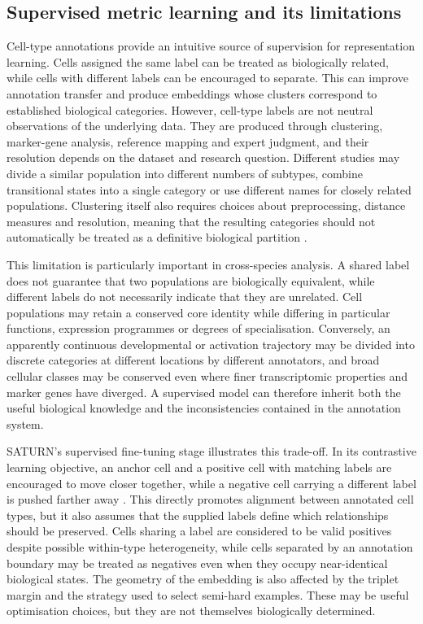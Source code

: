 \documentclass{article}
\begin{document}
\subsection{Supervised metric learning and its limitations}
Cell-type annotations provide an intuitive source of supervision for representation learning. Cells assigned the same label can be treated as biologically related, while cells with different labels can be encouraged to separate. This can improve annotation transfer and produce embeddings whose clusters correspond to established biological categories. However, cell-type labels are not neutral observations of the underlying data. They are produced through clustering, marker-gene analysis, reference mapping and expert judgment, and their resolution depends on the dataset and research question. Different studies may divide a similar population into different numbers of subtypes, combine transitional states into a single category or use different names for closely related populations. Clustering itself also requires choices about preprocessing, distance measures and resolution, meaning that the resulting categories should not automatically be treated as a definitive biological partition \cite{ClusteringChallenges}.

This limitation is particularly important in cross-species analysis. A shared label does not guarantee that two populations are biologically equivalent, while different labels do not necessarily indicate that they are unrelated. Cell populations may retain a conserved core identity while differing in particular functions, expression programmes or degrees of specialisation. Conversely, an apparently continuous developmental or activation trajectory may be divided into discrete categories at different locations by different annotators, and broad cellular classes may be conserved even where finer transcriptomic properties and marker genes have diverged. A supervised model can therefore inherit both the useful biological knowledge and the inconsistencies contained in the annotation system.

SATURN’s supervised fine-tuning stage illustrates this trade-off. In its contrastive learning objective, an anchor cell and a positive cell with matching labels are encouraged to move closer together, while a negative cell carrying a different label is pushed farther away \cite{SATURN,SATURN-xfer}. This directly promotes alignment between annotated cell types, but it also assumes that the supplied labels define which relationships should be preserved. Cells sharing a label are considered to be valid positives despite possible within-type heterogeneity, while cells separated by an annotation boundary may be treated as negatives even when they occupy near-identical biological states. The geometry of the embedding is also affected by the triplet margin and the strategy used to select semi-hard examples. These may be useful optimisation choices, but they are not themselves biologically determined.
\end{document}
